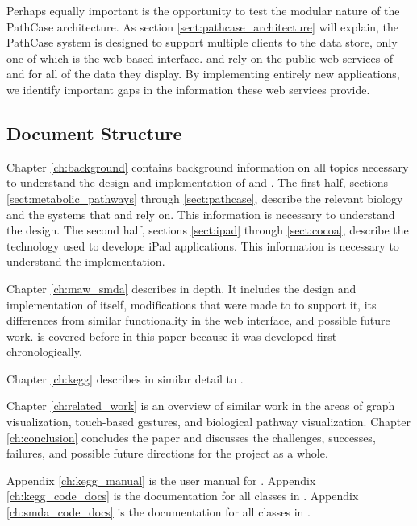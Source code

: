 Perhaps equally important is the opportunity to test the modular nature of the
PathCase architecture. As section \ref{sect:pathcase_architecture} will explain,
the PathCase system is designed to support multiple clients to the data store,
only one of which is the web-based interface. \keggapp and \mawapp rely on the
public web services of \pathcasekegg and \pathcasemaw for all of the data they
display. By implementing entirely new applications, we identify important gaps
in the information these web services provide.

\subsection{Document Structure}

Chapter \ref{ch:background} contains background information on all topics
necessary to understand the design and implementation of \keggapp and \mawapp.
The first half, sections \ref{sect:metabolic_pathways} through
\ref{sect:pathcase}, describe the relevant biology and the systems that \keggapp
and \mawapp rely on. This information is necessary to understand the design. The
second half, sections \ref{sect:ipad} through \ref{sect:cocoa}, describe the
technology used to develope iPad applications. This information is necessary to
understand the implementation.

Chapter \ref{ch:maw_smda} describes \mawapp in depth. It includes the design and
implementation of \mawapp itself, modifications that were made to \pathcasemaw
to support it, its differences from similar functionality in the \pathcasemaw
web interface, and possible future work. \mawapp is covered before \keggapp
in this paper because it was developed first chronologically.

Chapter \ref{ch:kegg} describes \keggapp in similar detail to \mawapp.

Chapter \ref{ch:related_work} is an overview of similar work in the areas of
graph visualization, touch-based gestures, and biological pathway visualization.
Chapter \ref{ch:conclusion} concludes the paper and discusses the challenges,
successes, failures, and possible future directions for the project as a whole.

Appendix \ref{ch:kegg_manual} is the user manual for \keggapp. Appendix
\ref{ch:kegg_code_docs} is the documentation for all classes in \mawapp.
Appendix \ref{ch:smda_code_docs} is the documentation for all classes in
\keggapp.
